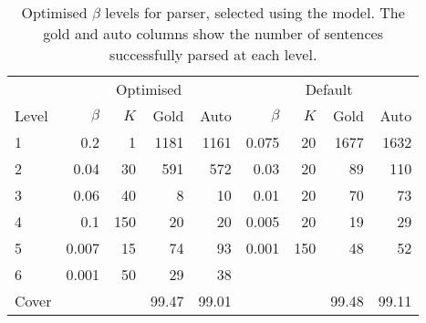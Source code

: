 \begin{table}
\centering
 \begin{tabular}{l|rrrr|rrrr}
\hline
      & \multicolumn{4}{c|}{Optimised}& \multicolumn{4}{c}{Default} \\
Level & $\beta$ & $K$ & Gold & Auto  & $\beta$ & $K$  & Gold & Auto \\
\hline
\hline
1     & 0.2   & 1    & 1181 & 1161 & 0.075   & 20  & 1677 & 1632\\
2     & 0.04  & 30   & 591  &  572 & 0.03    & 20  & 89   & 110\\
3     & 0.06  & 40   &   8  &   10 & 0.01    & 20  & 70   & 73\\
4     & 0.1   & 150  &  20  &   20 & 0.005   & 20  & 19   & 29\\
5     & 0.007 & 15   &  74  &   93 & 0.001   & 150 & 48   & 52\\
6     & 0.001 & 50   &  29  &   38 &         &     &      &    \\
\hline
Cover &       &      & 99.47& 99.01&         &     & 99.48& 99.11\\
\hline
\end{tabular}
\caption[Optimised $\beta$ levels for \trsys parser.]{Optimised $\beta$ levels
for \trsys parser, selected using the \derivsrev model. The gold and auto
columns show the number of sentences successfully parsed at each
level.\label{tab:hattr_betas}}
\end{table}

